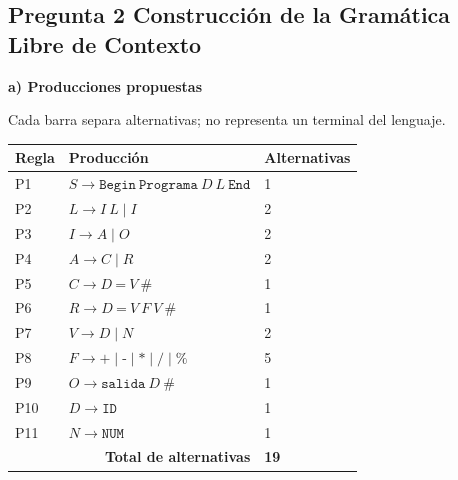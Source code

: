 \documentclass[11pt,letterpaper]{article}
\newcommand{\cod}[1]{\texttt{#1}}
\newcommand{\subtitulo}[1]{\vspace{5pt}\textbf{#1}\par\nopagebreak[4]}
\newcommand{\cab}[1]{\rowcolor{cabecera}#1}
\begin{document}
\subsection{Pregunta 2 Construcción de la Gramática Libre de Contexto}
\subtitulo{a) Producciones propuestas}
Cada barra separa alternativas; no representa un terminal del lenguaje.
\begin{center}
\begin{tabularx}{\textwidth}{|p{1.1cm}|X|p{2.4cm}|}\hline
\cab{\textbf{Regla}&\textbf{Producción}&\textbf{Alternativas}}\\\hline
P1&$S\to\cod{Begin}\ \cod{Programa}\ D\ L\ \cod{End}$&1\\\hline
P2&$L\to I\ L\mid I$&2\\\hline
P3&$I\to A\mid O$&2\\\hline
P4&$A\to C\mid R$&2\\\hline
P5&$C\to D\ \cod{=}\ V\ \cod{\#}$&1\\\hline
P6&$R\to D\ \cod{=}\ V\ F\ V\ \cod{\#}$&1\\\hline
P7&$V\to D\mid N$&2\\\hline
P8&$F\to\cod{+}\mid\cod{-}\mid\cod{*}\mid\cod{/}\mid\cod{\%}$&5\\\hline
P9&$O\to\cod{salida}\ D\ \cod{\#}$&1\\\hline
P10&$D\to\cod{ID}$&1\\\hline
P11&$N\to\cod{NUM}$&1\\\hline
\multicolumn{2}{|r|}{\textbf{Total de alternativas}}&\textbf{19}\\\hline
\end{tabularx}\end{center}
\end{document}
